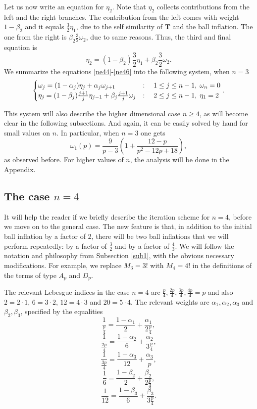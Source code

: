 \documentclass[amssymb,amsfonts,12pt]{amsart}
\begin{document}
Let us now write an equation for $\eta_2$. Note that $\eta_2$ collects contributions from the left and the right branches. The contribution from  the left comes with weight $1-\beta_2$ and it equals $\frac32\eta_1$, due to the self similarity of $\textbf{T}$ and the ball inflation. The one from the right is $\beta_2\frac32\omega_2$, due to same reasons.  Thus, the third and final equation is
\begin{equation}\label{ne46}
\eta_2=(1-\beta_2)\frac32\eta_1+\beta_2\frac32\omega_2.
\end{equation}
We summarize the equations \eqref{ne44}-\eqref{ne46} into the following system, when $n=3$
\begin{equation}
\label{ne47}
\begin{cases}\omega_j=(1-\alpha_j)\eta_j+\alpha_j\omega_{j+1}&:\quad 1\le j\le n-1,\;\omega_n=0 \\ \hfill \eta_j=(1-\beta_j)\frac{j+1}{j}\eta_{j-1}+\beta_j\frac{j+1}{j}\omega_{j}&:\quad 2\le j\le n-1,\;\eta_1=2 \end{cases}.
\end{equation}


This system will also describe the higher dimensional case $n\ge 4$, as will become clear in the following subsections. And again, it can be easily solved by hand for small values on $n$. In particular, when $n=3$ one gets
$$\omega_1(p)=\frac{9}{p-3}(1+\frac{12-p}{p^2-12p+18}),$$
as observed before. For higher values of $n$, the analysis will be done in the Appendix.
\bigskip






\subsection{The case $n=4$}


It will help the reader if we briefly describe the iteration scheme for $n=4$, before we move on to the general case. The new feature is that, in addition to the initial ball inflation by a factor of 2,  there will be two ball inflations that we will perform repeatedly: by a factor of $\frac32$ and by a factor of $\frac43$. We will follow the notation and philosophy from Subsection \ref{sub1}, with the obvious necessary modifications. For example, we replace $M_3=3!$ with $M_4=4!$ in the definitions of the terms of type $A_p$ and $D_p$.

The relevant Lebesgue indices in the case $n=4$ are $\frac{p}{4}, \frac{2p}{4}, \frac{3p}{4}, \frac{4p}{4}=p$ and also $2=2\cdot1$, $6=3\cdot 2$, $12=4\cdot 3$ and $20=5\cdot 4$. The relevant weights are $\alpha_1,\alpha_2,\alpha_3$ and $\beta_2,\beta_3$, specified by the equalities
$$\frac1{\frac{p}4}=\frac{1-\alpha_1}{2}+\frac{\alpha_1}{2\frac{p}{4}},$$
$$\frac1{\frac{2p}4}=\frac{1-\alpha_2}{6}+\frac{\alpha_2}{3\frac{p}{4}},$$
$$\frac1{\frac{3p}4}=\frac{1-\alpha_3}{12}+\frac{\alpha_3}{p},$$
$$\frac1{6}=\frac{1-\beta_2}{2}+\frac{\beta_2}{2\frac{p}4},$$
$$\frac1{12}=\frac{1-\beta_3}{6}+\frac{\beta_3}{3\frac{p}4}.$$
\end{document}
